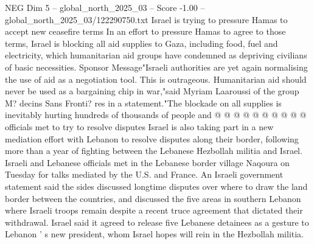 \begin{textsample}{NEG Dim 5 – global\_north\_2025\_03 – Score -1.00 – global\_north\_2025\_03/122290750.txt}
Israel is trying to pressure Hamas to accept new ceasefire terms In an effort to pressure Hamas to agree to those terms, Israel is blocking all aid supplies to Gaza, including food, fuel and electricity, which humanitarian aid groups have condemned as depriving civilians of basic necessities.
Sponsor Message"Israeli authorities are yet again normalising the use of aid as a negotiation tool.
This is outrageous.
Humanitarian aid should never be used as a bargaining chip in war,"said Myriam Laaroussi of the group M? decins Sans Fronti? res in a statement."The blockade on all supplies is inevitably hurting hundreds of thousands of people and @ @ @ @ @ @ @ @ @ @ officials met to try to resolve disputes Israel is also taking part in a new mediation effort with Lebanon to resolve disputes along their border, following more than a year of fighting between the Lebanese Hezbollah militia and Israel.
Israeli and Lebanese officials met in the Lebanese border village Naqoura on Tuesday for talks mediated by the U.S. and France.
An Israeli government statement said the sides discussed longtime disputes over where to draw the land border between the countries, and discussed the five areas in southern Lebanon where Israeli troops remain despite a recent truce agreement that dictated their withdrawal.
Israel said it agreed to release five Lebanese detainees as a gesture to Lebanon ' s new president, whom Israel hopes will rein in the Hezbollah militia.

\end{textsample}
